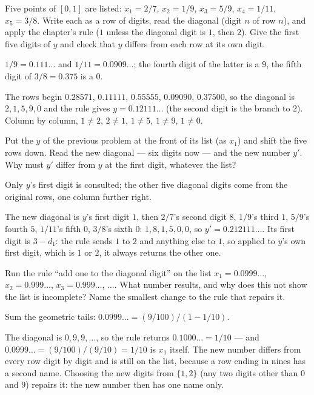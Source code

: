\begin{problem}
Five points of $[0,1]$ are listed: $x_1 = 2/7$, $x_2 = 1/9$, $x_3 =
5/9$, $x_4 = 1/11$, $x_5 = 3/8$. Write each as a row of digits, read
the diagonal (digit $n$ of row $n$), and apply the chapter's rule ($1$
unless the diagonal digit is $1$, then $2$). Give the first five digits
of $y$ and check that $y$ differs from each row at its own digit.
\begin{hint}
$1/9 = 0.111\ldots$ and $1/11 = 0.0909\ldots$; the fourth digit of the
latter is a $9$, the fifth digit of $3/8 = 0.375$ is a $0$.
\end{hint}
\begin{solution}
The rows begin $0.28571$, $0.11111$, $0.55555$, $0.09090$, $0.37500$,
so the diagonal is $2, 1, 5, 9, 0$ and the rule gives $y = 0.12111
\ldots$ (the second digit is the branch to $2$). Column by column, $1
\ne 2$, $2 \ne 1$, $1 \ne 5$, $1 \ne 9$, $1 \ne 0$.
\end{solution}
\end{problem}

\begin{problem}
Put the $y$ of the previous problem at the front of its list (as $x_1$)
and shift the five rows down. Read the new diagonal — six digits now —
and the new number $y'$. Why must $y'$ differ from $y$ at the first
digit, whatever the list?
\begin{hint}
Only $y$'s first digit is consulted; the other five diagonal digits
come from the original rows, one column further right.
\end{hint}
\begin{solution}
The new diagonal is $y$'s first digit $1$, then $2/7$'s second digit
$8$, $1/9$'s third $1$, $5/9$'s fourth $5$, $1/11$'s fifth $0$, $3/8$'s
sixth $0$: $1, 8, 1, 5, 0, 0$, so $y' = 0.212111\ldots$. Its first
digit is $3 - d_1$: the rule sends $1$ to $2$ and anything else to $1$,
so applied to $y$'s own first digit, which is $1$ or $2$, it always
returns the other one.
\end{solution}
\end{problem}

\begin{problem}
Run the rule ``add one to the diagonal digit'' on the list $x_1 =
0.0999\ldots$, $x_2 = 0.999\ldots$, $x_3 = 0.999\ldots$, $\ldots$.
What number results, and why does this not show the list is
incomplete? Name the smallest change to the rule that repairs it.
\begin{hint}
Sum the geometric tails: $0.0999\ldots = (9/100)/(1 - 1/10)$.
\end{hint}
\begin{solution}
The diagonal is $0, 9, 9, \ldots$, so the rule returns $0.1000\ldots =
1/10$ — and $0.0999\ldots = (9/100)/(9/10) = 1/10$ is $x_1$ itself.
The new number differs from every row digit by digit and is still on
the list, because a row ending in nines has a second name. Choosing the
new digits from $\{1, 2\}$ (any two digits other than $0$ and $9$)
repairs it: the new number then has one name only.
\end{solution}
\end{problem}

